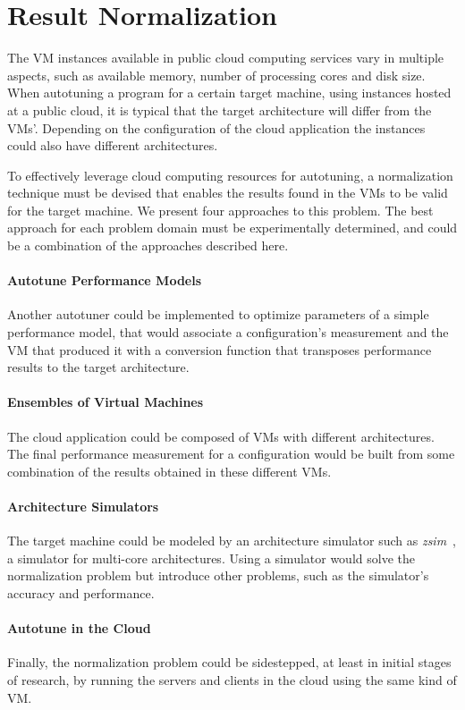 \section{Result Normalization}
\label{sec:norm}

The VM instances available in public cloud computing services
vary in multiple aspects, such as available memory, number of processing cores
and disk size.
When autotuning a program for a certain target machine, using instances
hosted at a public cloud, it is typical that the target architecture will
differ from the VMs'. Depending on the configuration of the
cloud application the instances could also have different architectures.

To effectively leverage cloud computing resources for autotuning, a
normalization technique must be devised that enables the results found in the
VMs to be valid for the target machine.  We present four
approaches to this problem. The best approach for each problem domain must be
experimentally determined, and could be a combination of the approaches
described here.

\paragraph{Autotune Performance Models}
Another autotuner could be implemented to optimize parameters of a simple
performance model, that would associate a configuration's measurement and the
VM that produced it with a conversion function that transposes
performance results to the target architecture.

\paragraph{Ensembles of Virtual Machines}
The cloud application could be composed of VMs with different
architectures. The final performance measurement for a configuration would be
built from some combination of the results obtained in these different
VMs.

\paragraph{Architecture Simulators} 
The target machine could be modeled by an architecture simulator such as
\emph{zsim}~\cite{sanchez2013zsim}, a simulator for multi-core architectures.
Using a simulator would solve the normalization problem but introduce other
problems, such as the simulator's accuracy and performance.

\paragraph{Autotune in the Cloud}
Finally, the normalization problem could be sidestepped, at least in initial
stages of research, by running the servers and clients in the cloud using
the same kind of VM.
